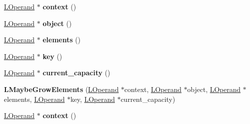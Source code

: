 \begin{DoxyCompactItemize}
\item 
\hyperlink{classv8_1_1internal_1_1_l_operand}{L\+Operand} $\ast$ {\bfseries context} ()\hypertarget{classv8_1_1internal_1_1_l_maybe_grow_elements_a6af5b70c66f542bb308ac9ada8cb6372}{}\label{classv8_1_1internal_1_1_l_maybe_grow_elements_a6af5b70c66f542bb308ac9ada8cb6372}

\item 
\hyperlink{classv8_1_1internal_1_1_l_operand}{L\+Operand} $\ast$ {\bfseries object} ()\hypertarget{classv8_1_1internal_1_1_l_maybe_grow_elements_a557ff494aa6f7b9a2a5f218005419b34}{}\label{classv8_1_1internal_1_1_l_maybe_grow_elements_a557ff494aa6f7b9a2a5f218005419b34}

\item 
\hyperlink{classv8_1_1internal_1_1_l_operand}{L\+Operand} $\ast$ {\bfseries elements} ()\hypertarget{classv8_1_1internal_1_1_l_maybe_grow_elements_aa58e07c5ac443be8021a0a6dbfe237cb}{}\label{classv8_1_1internal_1_1_l_maybe_grow_elements_aa58e07c5ac443be8021a0a6dbfe237cb}

\item 
\hyperlink{classv8_1_1internal_1_1_l_operand}{L\+Operand} $\ast$ {\bfseries key} ()\hypertarget{classv8_1_1internal_1_1_l_maybe_grow_elements_ac0b59ca4db13f2a31428c9b8063321dc}{}\label{classv8_1_1internal_1_1_l_maybe_grow_elements_ac0b59ca4db13f2a31428c9b8063321dc}

\item 
\hyperlink{classv8_1_1internal_1_1_l_operand}{L\+Operand} $\ast$ {\bfseries current\+\_\+capacity} ()\hypertarget{classv8_1_1internal_1_1_l_maybe_grow_elements_a8fc52ebb7ecf6d10f977d9b56cfe702d}{}\label{classv8_1_1internal_1_1_l_maybe_grow_elements_a8fc52ebb7ecf6d10f977d9b56cfe702d}

\item 
{\bfseries L\+Maybe\+Grow\+Elements} (\hyperlink{classv8_1_1internal_1_1_l_operand}{L\+Operand} $\ast$context, \hyperlink{classv8_1_1internal_1_1_l_operand}{L\+Operand} $\ast$object, \hyperlink{classv8_1_1internal_1_1_l_operand}{L\+Operand} $\ast$elements, \hyperlink{classv8_1_1internal_1_1_l_operand}{L\+Operand} $\ast$key, \hyperlink{classv8_1_1internal_1_1_l_operand}{L\+Operand} $\ast$current\+\_\+capacity)\hypertarget{classv8_1_1internal_1_1_l_maybe_grow_elements_aae48ee99b99d58f8e16bc264666c78ff}{}\label{classv8_1_1internal_1_1_l_maybe_grow_elements_aae48ee99b99d58f8e16bc264666c78ff}

\item 
\hyperlink{classv8_1_1internal_1_1_l_operand}{L\+Operand} $\ast$ {\bfseries context} ()\hypertarget{classv8_1_1internal_1_1_l_maybe_grow_elements_a6af5b70c66f542bb308ac9ada8cb6372}{}\label{classv8_1_1internal_1_1_l_maybe_grow_elements_a6af5b70c66f542bb308ac9ada8cb6372}


\end{DoxyCompactItemize}
